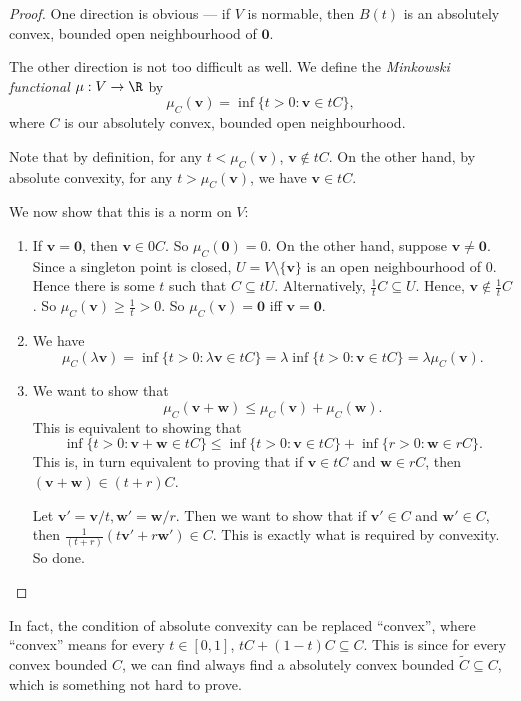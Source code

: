 \documentclass[a4paper]{article}
\begin{document}
\begin{proof}
  One direction is obvious --- if $V$ is normable, then $B(t)$ is an absolutely convex, bounded open neighbourhood of $\mathbf{0}$.

  The other direction is not too difficult as well. We define the \emph{Minkowski functional} $\mu: V \to \R$ by
  \[
    \mu_C(\mathbf{v}) = \inf \{t > 0: \mathbf{v}\in tC\},
  \]
  where $C$ is our absolutely convex, bounded open neighbourhood.

  Note that by definition, for any $t < \mu_C(\mathbf{v})$, $\mathbf{v}\not\in tC$. On the other hand, by absolute convexity, for any $t > \mu_C(\mathbf{v})$, we have $\mathbf{v}\in tC$.

  We now show that this is a norm on $V$:
  \begin{enumerate}
    \item If $\mathbf{v} = \mathbf{0}$, then $\mathbf{v}\in 0C$. So $\mu_C(\mathbf{0}) = 0$. On the other hand, suppose $\mathbf{v} \not= \mathbf{0}$. Since a singleton point is closed, $U = V\setminus \{\mathbf{v}\}$ is an open neighbourhood of $0$. Hence there is some $t$ such that $C\subseteq tU$. Alternatively, $\frac{1}{t}C \subseteq U$. Hence, $\mathbf{v}\not\in \frac{1}{t}C$. So $\mu_C (\mathbf{v}) \geq \frac{1}{t} > 0$. So $\mu_C (\mathbf{v}) = \mathbf{0}$ iff $\mathbf{v} = \mathbf{0}$.

    \item We have
      \[
        \mu_C(\lambda \mathbf{v}) = \inf \{t> 0: \lambda \mathbf{v}\in tC\} = \lambda \inf \{t > 0: \mathbf{v}\in tC\} = \lambda \mu_C(\mathbf{v}).
      \]
    \item We want to show that
      \[
        \mu_C (\mathbf{v} + \mathbf{w}) \leq \mu_C(\mathbf{v}) + \mu_C(\mathbf{w}).
      \]
      This is equivalent to showing that
      \[
        \inf\{t > 0: \mathbf{v} + \mathbf{w} \in tC\} \leq \inf\{t > 0: \mathbf{v}\in tC\} + \inf\{r > 0: \mathbf{w}\in rC\}.
      \]
      This is, in turn equivalent to proving that if $\mathbf{v}\in tC$ and $\mathbf{w}\in rC$, then $(\mathbf{v} + \mathbf{w})\in (t + r)C$.

      Let $\mathbf{v}' = \mathbf{v}/t, \mathbf{w}' = \mathbf{w}/r$. Then we want to show that if $\mathbf{v}' \in C$ and $\mathbf{w}' \in C$, then $\frac{1}{(t + r)}(t \mathbf{v}' + r \mathbf{w}') \in C$. This is exactly what is required by convexity. So done.
  \end{enumerate}
\end{proof}
In fact, the condition of absolute convexity can be replaced ``convex'', where ``convex'' means for every $t\in [0, 1]$, $tC + (1 - t)C \subseteq C$. This is since for every convex bounded $C$, we can find always find a absolutely convex bounded $\tilde{C} \subseteq C$, which is something not hard to prove.
\end{document}

